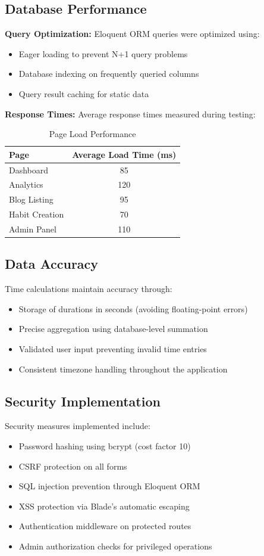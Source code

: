 \documentclass[12pt,a4paper]{report}
\newcommand{\JustifiedNormal}{\fontsize{12}{14}\selectfont\justifying\setlength{\parindent}{0pt}}
\begin{document}
\subsection{Database Performance}
\JustifiedNormal
\textbf{Query Optimization:} Eloquent ORM queries were optimized using:
\begin{itemize}
  \item Eager loading to prevent N+1 query problems
  \item Database indexing on frequently queried columns
  \item Query result caching for static data
\end{itemize}

\textbf{Response Times:} Average response times measured during testing:
\begin{table}[H]
\centering
\caption{Page Load Performance}
\begin{tabular}{|l|c|}
\hline
\textbf{Page} & \textbf{Average Load Time (ms)} \\
\hline
Dashboard & 85 \\
Analytics & 120 \\
Blog Listing & 95 \\
Habit Creation & 70 \\
Admin Panel & 110 \\
\hline
\end{tabular}
\end{table}

\subsection{Data Accuracy}
\JustifiedNormal
Time calculations maintain accuracy through:
\begin{itemize}
  \item Storage of durations in seconds (avoiding floating-point errors)
  \item Precise aggregation using database-level summation
  \item Validated user input preventing invalid time entries
  \item Consistent timezone handling throughout the application
\end{itemize}

\subsection{Security Implementation}
\JustifiedNormal
Security measures implemented include:
\begin{itemize}
  \item Password hashing using bcrypt (cost factor 10)
  \item CSRF protection on all forms
  \item SQL injection prevention through Eloquent ORM
  \item XSS protection via Blade's automatic escaping
  \item Authentication middleware on protected routes
  \item Admin authorization checks for privileged operations
\end{itemize}
\end{document}
